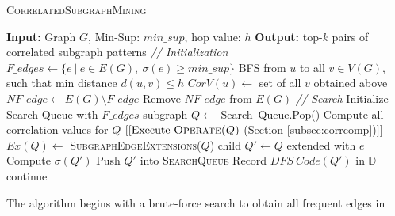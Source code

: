 \begin{algorithm}%
	\caption{\textsc{CorrelatedSubgraphMining}}\label{algo:csm_}
	\dontprintsemicolon
	\nonl \textbf{Input:} Graph $G$, {\sf Min-Sup:} $min\_sup$, hop value: $h$\;
	\nonl \textbf{Output:} top-$k$ pairs of correlated subgraph patterns  \;
	\vspace{0.3mm}
	\nonl \textit{// Initialization } \;
	\vspace{0.3mm}
	$F\_edges\leftarrow \{e\ |\ e \in E(G),\ \sigma(e) \geq min\_sup \}$\;
		{\textsc{BFS} from $u$ to all $v\in V(G)$, such that min distance
		$d(u,v)\le h$\; $CorV(u) \leftarrow$ set of all $v$ obtained above\;}
		$NF\_edge\leftarrow E(G)\setminus F\_edge$ \; Remove $NF\_edge$ from
		$E(G)$\; 
	\vspace{1mm}
	\nonl \textit{// Search } \;
	\vspace{0.3mm} 
	Initialize {\sf Search Queue} with $F\_edges$ \;
		{
			subgraph $Q \leftarrow$ {\sf Search\
			Queue.Pop()}\;
			Compute all correlation values for $Q$\;
			\nonl $[[\textnormal{Execute}\ \textsc{Operate($Q$)}$ (Section \ref{subsec:corrcomp})$]]$\;
			$Ex(Q) \leftarrow $ \textsc{SubgraphEdgeExtensions($Q$)}\;
			{
				child $Q'\leftarrow Q$ extended with $e$\;
				{
					Compute $\sigma(Q')$ \;
					{
						Push $Q'$ into \textsc{SearchQueue}\;
					}
					Record $DFS\ Code(Q')$ in $\mathbb{D}$\;
				}
				\Else
				{
					continue\;
				}
			}
		}
		\;
\end{algorithm}
The algorithm begins with a brute-force search to obtain all frequent edges in
